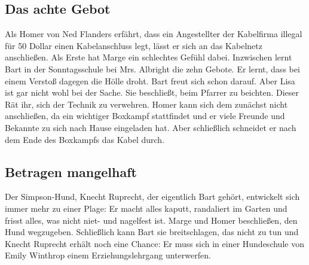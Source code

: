 	
\subsection{Das achte Gebot}\label{7F13}
Als Homer von Ned Flanders erfährt, dass ein Angestellter der Kabelfirma illegal für 50 Dollar einen Kabelanschluss legt, lässt er sich an das Kabelnetz anschließen. Als Erste hat Marge ein schlechtes Gefühl dabei. Inzwischen lernt Bart in der Sonntagsschule bei Mrs. Albright die zehn Gebote. Er lernt, dass bei einem Verstoß dagegen die Hölle droht. Bart freut sich schon darauf. Aber Lisa ist gar nicht wohl bei der Sache. Sie beschließt, beim Pfarrer zu beichten. Dieser Rät ihr, sich der Technik zu verwehren. Homer kann sich dem zunächst nicht anschließen, da ein wichtiger Boxkampf stattfindet und er viele Freunde und Bekannte zu sich nach Hause eingeladen hat. Aber schließlich schneidet er nach dem Ende des Boxkampfs das Kabel durch.


	
\subsection{Betragen mangelhaft}\label{7F14}
Der Simpson-Hund, Knecht Ruprecht, der eigentlich Bart gehört, entwickelt sich immer mehr zu einer Plage: Er macht alles kaputt, randaliert im Garten und frisst alles, was nicht niet- und nagelfest ist. Marge und Homer beschließen, den Hund wegzugeben. Schließlich kann Bart sie breitschlagen, das nicht zu tun und Knecht Ruprecht erhält noch eine Chance: Er muss sich in einer Hundeschule von Emily Winthrop einem Erziehungslehrgang unterwerfen.

